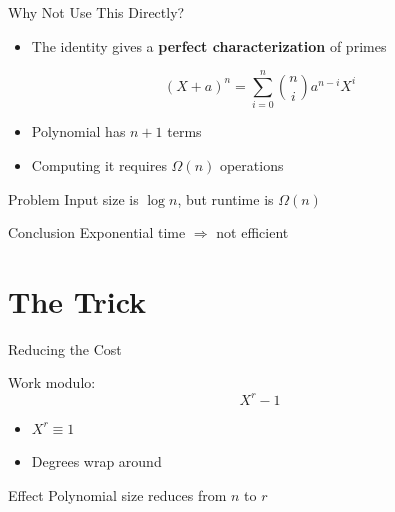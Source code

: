 \documentclass{beamer}
\begin{document}
\begin{frame}{Why Not Use This Directly?}

\begin{itemize}
    \item The identity gives a \textbf{perfect characterization} of primes
\end{itemize}


\[
(X+a)^n = \sum_{i=0}^{n} \binom{n}{i} a^{n-i} X^i
\]


\begin{itemize}
    \item Polynomial has $n+1$ terms
    \item Computing it requires $\Omega(n)$ operations
\end{itemize}


\begin{block}{Problem}
Input size is $\log n$, but runtime is $\Omega(n)$
\end{block}

\vspace{0.5em}

\begin{block}{Conclusion}
Exponential time $\Rightarrow$ not efficient
\end{block}

\end{frame}

\section{The Trick}

\begin{frame}{Reducing the Cost}

Work modulo:
\[
X^r - 1
\]


\begin{itemize}
    \item $X^r \equiv 1$
    \item Degrees wrap around
\end{itemize}


\begin{block}{Effect}
Polynomial size reduces from $n$ to $r$
\end{block}

\end{frame}
\end{document}
